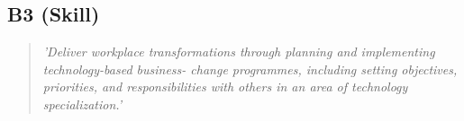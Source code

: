 \subsection{B3 (Skill)}

  \begin{quote}
    \textit{'Deliver workplace transformations through
    planning and implementing technology-based business-
    change programmes, including setting objectives,
    priorities, and responsibilities with others in an area of
    technology specialization.'}
  \end{quote}

\newpage